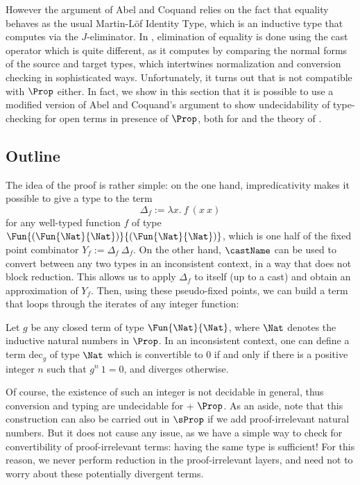   However the argument of Abel and Coquand relies on the fact that
  equality behaves as the usual Martin-Löf Identity Type, which is an
  inductive type that computes via the \( J \)-eliminator.
  In \SetoidCC, elimination of equality is done using the cast operator
  which is quite different, as it computes by comparing the normal forms
  of the source and target types, which intertwines normalization and
  conversion checking in sophisticated ways.
  Unfortunately, it turns out that \SetoidCC is not compatible with \( \Prop \)
  either.
  In fact, we show in this section that it is possible to use a modified
  version of Abel and Coquand's argument to show undecidability of
  type-checking for open terms in presence of \( \Prop \), both for
  \SetoidCC and the theory of .
  
  \subsection{Outline}
  
  The idea of the proof is rather simple:
  on the one hand, impredicativity makes it possible to give a type to the term
  \[
  \Delta_f := \lambda x .\ f\ (x\ x)
  \]
  for any well-typed function \( f \) of type \( \Fun{(\Fun{\Nat}{\Nat})}{(\Fun{\Nat}{\Nat})} \), which is one half of the fixed point
  combinator \( Y_f := \Delta_f\ \Delta_f \).
  On the other hand, \( \castName \) can be used to convert between any two types
  in an inconsistent context, in a way that does not block reduction.
  This allows us to apply \( \Delta_f \) to itself (up to a cast) and obtain
  an approximation of \( Y_f \).
  Then, using these pseudo-fixed points, we can build a term that loops through the
  iterates of any integer function:
  \begin{theorem}
    Let \( g \) be any closed term of type \( \Fun{\Nat}{\Nat} \), where \( \Nat \)
    denotes the inductive natural numbers in \( \Prop \).
    In an inconsistent context, one can define a term \( \mathrm{dec}_g \)
    of type \( \Nat \) which is convertible to 0 if and only if there is a positive integer
    \( n \) such that \( g^n\ 1 = 0 \), and diverges otherwise.
  \end{theorem}
  Of course, the existence of such an integer is not decidable in general,
  thus conversion and typing are undecidable for \SetoidCC + \( \Prop \).
  As an aside, note that this construction can also be carried out in
  \( \sProp \) if we add proof-irrelevant natural numbers. But it does
  not cause any issue, as we have a simple way to check for convertibility of
  proof-irrelevant terms: having the same type is sufficient! For this reason,
  we never perform reduction in the proof-irrelevant layers, and need not
  to worry about these potentially divergent terms.
  
